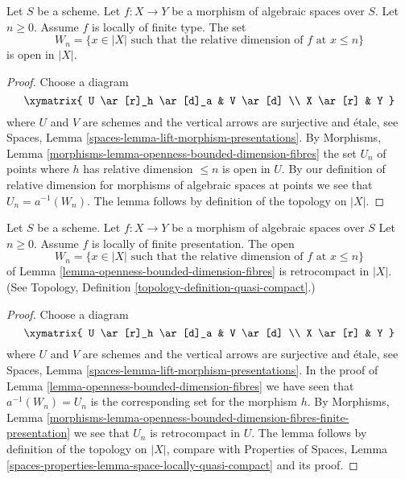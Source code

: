 \begin{lemma}
\label{lemma-openness-bounded-dimension-fibres}
Let $S$ be a scheme.
Let $f : X \to Y$ be a morphism of algebraic spaces over $S$.
Let $n \geq 0$. Assume $f$ is locally of finite type.
The set
$$
W_n = \{x \in |X|
\text{ such that the relative dimension of }f\text{ at } x \leq n\}
$$
is open in $|X|$.
\end{lemma}

\begin{proof}
Choose a diagram
$$
\xymatrix{
U \ar[r]_h \ar[d]_a & V \ar[d] \\
X \ar[r] & Y
}
$$
where $U$ and $V$ are schemes and the vertical arrows are surjective and
\'etale, see
Spaces, Lemma \ref{spaces-lemma-lift-morphism-presentations}.
By
Morphisms, Lemma \ref{morphisms-lemma-openness-bounded-dimension-fibres}
the set $U_n$ of points where $h$ has relative dimension
$\leq n$ is open in $U$. By our definition of relative dimension
for morphisms of algebraic spaces at points we see that
$U_n = a^{-1}(W_n)$.
The lemma follows by definition of the topology on $|X|$.
\end{proof}

\begin{lemma}
\label{lemma-openness-bounded-dimension-fibres-finite-presentation}
Let $S$ be a scheme.
Let $f : X \to Y$ be a morphism of algebraic spaces over $S$
Let $n \geq 0$. Assume $f$ is locally of finite presentation.
The open
$$
W_n = \{x \in |X|
\text{ such that the relative dimension of }f\text{ at } x \leq n\}
$$
of Lemma \ref{lemma-openness-bounded-dimension-fibres}
is retrocompact in $|X|$. (See
Topology, Definition \ref{topology-definition-quasi-compact}.)
\end{lemma}

\begin{proof}
Choose a diagram
$$
\xymatrix{
U \ar[r]_h \ar[d]_a & V \ar[d] \\
X \ar[r] & Y
}
$$
where $U$ and $V$ are schemes and the vertical arrows are surjective and
\'etale, see
Spaces, Lemma \ref{spaces-lemma-lift-morphism-presentations}.
In the proof of
Lemma \ref{lemma-openness-bounded-dimension-fibres}
we have seen that $a^{-1}(W_n) = U_n$ is the corresponding set
for the morphism $h$. By
Morphisms, Lemma
\ref{morphisms-lemma-openness-bounded-dimension-fibres-finite-presentation}
we see that $U_n$ is retrocompact in $U$.
The lemma follows by definition of the topology on $|X|$, compare with
Properties of Spaces,
Lemma \ref{spaces-properties-lemma-space-locally-quasi-compact}
and its proof.
\end{proof}

